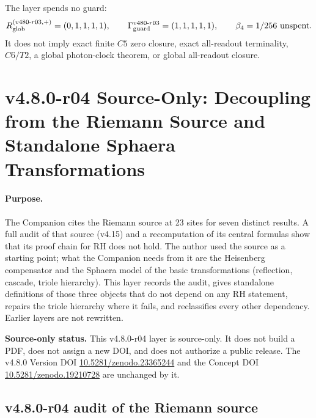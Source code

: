 The layer spends no guard:
\[
R_{\rm glob}^{(v480\text{-}r03,+)}=(0,1,1,1,1),
\qquad
\Gamma_{\rm guard}^{v480\text{-}r03}=(1,1,1,1,1),
\qquad
\beta_4=1/256\ \text{unspent}.
\]
It does not imply exact finite \(C5\) zero closure, exact all-readout terminality,
\(C6/T2\), a global photon-clock theorem, or global all-readout closure.

\clearpage
\section*{v4.8.0-r04 Source-Only: Decoupling from the Riemann Source and Standalone Sphaera Transformations}
\label{sec:v480-r04-riemann-decoupling}

\paragraph{Purpose.}
The Companion cites the Riemann source \cite{brendecke2026rh} at 23 sites for seven distinct
results.  A full audit of that source (v4.15) and a recomputation of its central formulas
show that its proof chain for RH does not hold.  The author used the source as a starting
point; what the Companion needs from it are the Heisenberg compensator and the Sphaera model
of the basic transformations (reflection, cascade, triole hierarchy).  This layer records the
audit, gives standalone definitions of those three objects that do not depend on any RH
statement, repairs the triole hierarchy where it fails, and reclassifies every other
dependency.  Earlier layers are not rewritten.

\noindent\textbf{Source-only status.}
This v4.8.0-r04 layer is source-only.  It does not build a PDF, does not assign a new DOI,
and does not authorize a public release.  The v4.8.0 Version DOI
\href{https://doi.org/10.5281/zenodo.23365244}{10.5281/zenodo.23365244} and the Concept DOI
\href{https://doi.org/10.5281/zenodo.19210728}{10.5281/zenodo.19210728} are unchanged by it.

\subsection*{v4.8.0-r04 audit of the Riemann source}
\label{subsec:v480-r04-source-audit}

